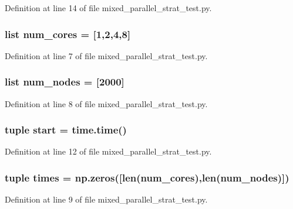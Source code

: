 Definition at line 14 of file mixed\-\_\-parallel\-\_\-strat\-\_\-test.\-py.

\hypertarget{namespacemixed__parallel__strat__test_a2aef08ba119878974b70d51fca7b65bd}{
\subsubsection[{num\-\_\-cores}]{\setlength{\rightskip}{0pt plus 5cm}list num\-\_\-cores = \mbox{[}1,2,4,8\mbox{]}}}\label{namespacemixed__parallel__strat__test_a2aef08ba119878974b70d51fca7b65bd}


Definition at line 7 of file mixed\-\_\-parallel\-\_\-strat\-\_\-test.\-py.

\hypertarget{namespacemixed__parallel__strat__test_aa960f02b9f7f22de9e3fbe916ffe62ac}{
\subsubsection[{num\-\_\-nodes}]{\setlength{\rightskip}{0pt plus 5cm}list num\-\_\-nodes = \mbox{[}2000\mbox{]}}}\label{namespacemixed__parallel__strat__test_aa960f02b9f7f22de9e3fbe916ffe62ac}


Definition at line 8 of file mixed\-\_\-parallel\-\_\-strat\-\_\-test.\-py.

\hypertarget{namespacemixed__parallel__strat__test_ac19c5d7b91bdfde51f8a7f0614c6e424}{
\subsubsection[{start}]{\setlength{\rightskip}{0pt plus 5cm}tuple start = time.\-time()}}\label{namespacemixed__parallel__strat__test_ac19c5d7b91bdfde51f8a7f0614c6e424}


Definition at line 12 of file mixed\-\_\-parallel\-\_\-strat\-\_\-test.\-py.

\hypertarget{namespacemixed__parallel__strat__test_a7a4cdc1f55476e6705c9c39b53d8ecb9}{
\subsubsection[{times}]{\setlength{\rightskip}{0pt plus 5cm}tuple times = np.\-zeros(\mbox{[}len({\bf num\-\_\-cores}),len({\bf num\-\_\-nodes})\mbox{]})}}\label{namespacemixed__parallel__strat__test_a7a4cdc1f55476e6705c9c39b53d8ecb9}


Definition at line 9 of file mixed\-\_\-parallel\-\_\-strat\-\_\-test.\-py.

